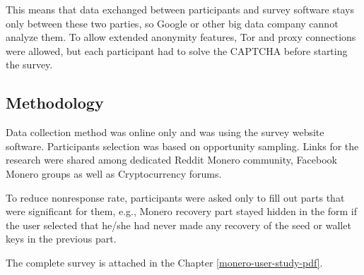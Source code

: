 \documentclass[
  printed, %
  table,   %
  lof,     %
  lot,     %
           oneside, color
]{fithesis3}
\begin{document}
This means that data exchanged between participants and survey software stays only between these two parties, so Google or other big data company cannot analyze them. To allow extended anonymity features, Tor and proxy connections were allowed, but each participant had to solve the CAPTCHA before starting the survey.
\subsection{Methodology}
Data collection method was online only and was using the survey website software. Participants selection was based on opportunity sampling. Links for the research were shared among dedicated Reddit Monero community, Facebook Monero groups as well as Cryptocurrency forums.

To reduce nonresponse rate, participants were asked only to fill out parts that were significant for them, e.g., Monero recovery part stayed hidden in the form if the user selected that he/she had never made any recovery of the seed or wallet keys in the previous part. 

The complete survey is attached in the Chapter \ref{monero-user-study-pdf}.
\end{document}
